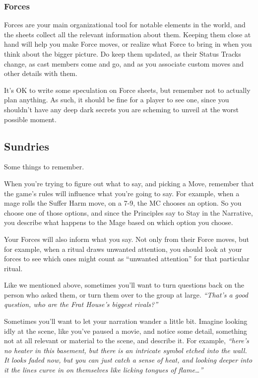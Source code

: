 \documentclass[
]{article}
\begin{document}
\hypertarget{forces}{%
\subsubsection{Forces}\label{forces}}

Forces are your main organizational tool for notable elements in the
world, and the sheets collect all the relevant information about them.
Keeping them close at hand will help you make Force moves, or realize
what Force to bring in when you think about the bigger picture. Do keep
them updated, as their Status Tracks change, as cast members come and
go, and as you associate custom moves and other details with them.

It's OK to write some speculation on Force sheets, but remember not to
actually plan anything. As such, it should be fine for a player to see
one, since you shouldn't have any deep dark secrets you are scheming to
unveil at the worst possible moment.

\hypertarget{sundries}{%
\subsection{Sundries}\label{sundries}}

Some things to remember.

When you're trying to figure out what to say, and picking a Move,
remember that the game's rules will influence what you're going to say.
For example, when a mage rolls the Suffer Harm move, on a 7-9, the MC
chooses an option. So you choose one of those options, and since the
Principles say to Stay in the Narrative, you describe what happens to
the Mage based on which option you choose.

Your Forces will also inform what you say. Not only from their Force
moves, but for example, when a ritual draws unwanted attention, you
should look at your forces to see which ones might count as ``unwanted
attention'' for that particular ritual.

Like we mentioned above, sometimes you'll want to turn questions back on
the person who asked them, or turn them over to the group at large.
\emph{``That's a good question, who are the Frat House's biggest
rivals?''}

Sometimes you'll want to let your narration wander a little bit. Imagine
looking idly at the scene, like you've paused a movie, and notice some
detail, something not at all relevant or material to the scene, and
describe it. For example, \emph{``here's no heater in this basement, but
there is an intricate symbol etched into the wall. It looks faded now,
but you can just catch a sense of heat, and looking deeper into it the
lines curve in on themselves like licking tongues of flame\ldots{}''}
\end{document}
